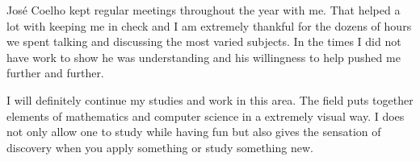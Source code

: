 José Coelho kept regular meetings throughout the year with me. That helped a lot with keeping me in check and I am extremely thankful for the dozens of hours we spent talking and discussing the most varied subjects. In the times I did not have work to show he was understanding and his willingness to help pushed me further and further. 

I will definitely continue my studies and work in this area. The field puts together elements of mathematics and computer science in a extremely visual way. I does not only allow one to study while having fun but also gives the sensation of discovery when you apply something or study something new.









